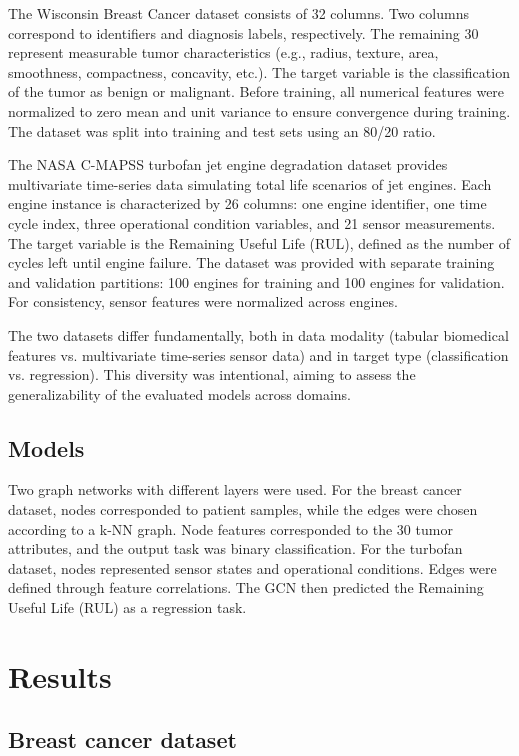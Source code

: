 \documentclass[12pt]{article}
\begin{document}
The Wisconsin Breast Cancer dataset consists of 32 columns. Two columns correspond to identifiers and diagnosis labels, respectively.
The remaining 30 represent measurable tumor characteristics (e.g., radius, texture, area, smoothness, compactness, concavity, etc.). The target variable is the classification of the tumor as benign or malignant. Before training, all numerical features were normalized to zero mean and unit variance to ensure convergence during training. The dataset was split into training and test sets using an 80/20 ratio.


The NASA C-MAPSS turbofan jet engine degradation dataset provides multivariate time-series data simulating total life scenarios of jet engines. Each engine instance is characterized by 26 columns: one engine identifier, one time cycle index, three operational condition variables, and 21 sensor measurements. The target variable is the Remaining Useful Life (RUL), defined as the number of cycles left until engine failure.
The dataset was provided with separate training and validation partitions: 100 engines for training and 100 engines for validation. For consistency, sensor features were normalized across engines.


The two datasets differ fundamentally, both in data modality (tabular biomedical features vs. multivariate time-series sensor data) and in target type (classification vs. regression). This diversity was intentional, aiming to assess the generalizability of the evaluated models across domains.


\subsection{Models}
Two graph networks with different layers were used.
For the breast cancer dataset, nodes corresponded to patient samples, while the edges were chosen according to a k-NN graph. Node features corresponded to the 30 tumor attributes, and the output task was binary classification.
For the turbofan dataset, nodes represented sensor states and operational conditions. Edges were defined through feature correlations. The GCN then predicted the Remaining Useful Life (RUL)
as a regression task.

\section{Results}
\subsection{Breast cancer dataset}
\end{document}
